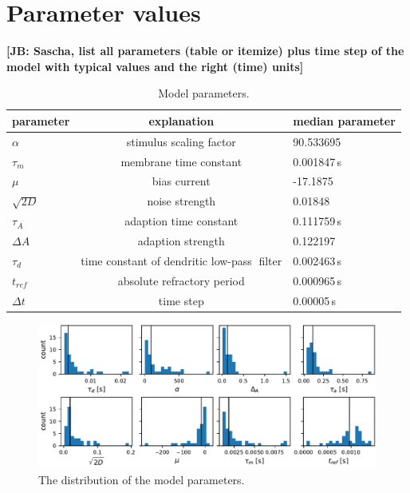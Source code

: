 \documentclass[12pt,a4paper]{article}
\newcommand{\note}[2][]{\textbf{[#1: #2]}}
\begin{document}
\section{Parameter values}

\note[JB]{Sascha, list all parameters (table or itemize) plus time step of the model with typical values and the right (time) units}


\begin{table}[h!]
  \begin{center}
    \caption{Model parameters.}
    \label{tab:table1}
    \begin{tabular}{l|c|l}
      
      parameter & explanation & median parameter \\
      \hline
      $\alpha$  & stimulus scaling factor &  90.533695\\
      $\tau_{m}$  & membrane time constant &  0.001847\,s\\       
      $\mu$  & bias current &  -17.1875\\      
      $\sqrt{2D}$  & noise strength &  0.01848 \\      
      $\tau_{A}$  & adaption time constant &  0.111759\,s\\      
      $\Delta A$  & adaption strength &  0.122197\\      
      $\tau_{d}$  & time constant of dendritic low-pass filter &  0.002463\,s\\      
      $t_{ref}$  & absolute refractory period &  0.000965\,s\\     
	  $\Delta t$  & time step &  0.00005\,s\\           
    \end{tabular}
  \end{center}
\end{table}
\begin{figure}[tp]
  \includegraphics{parameter_distribution}
  \caption{\label{parameter_distribution} The distribution of the model parameters.
}
\end{figure}
\end{document}
